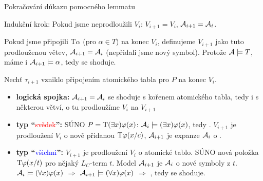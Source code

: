 \documentclass{beamer}
\begin{document}
\begin{frame}{Pokračování důkazu pomocného lemmatu}

    \vspace{-6pt}
    \alert{Indukční krok:} Pokud jsme neprodloužili $V_i$: $V_{i+1}=V_i$, $\mathcal{A}_{i+1}=\mathcal{A}_i$.

    \vspace{-3pt}

    Pokud jsme připojili $\mathrm{T}\alpha$ (pro $\alpha\in T$) na konec $V_i$, definujeme $V_{i+1}$ jako tuto prodlouženou větev, $\mathcal{A}_{i+1}=\mathcal{A}_i$ (nepřidali jsme nový symbol). Protože $\mathcal{A}\models T$, máme i $\mathcal{A}_{i+1}\models\alpha$, tedy se shoduje.
  
    Nechť $\tau_{i+1}$ vzniklo připojením atomického tabla pro $P$ na konec $V_i$.

    \vspace{-3pt}
    
    \begin{itemize}
        \item \textbf{logická spojka:} $\mathcal{A}_{i+1}=\mathcal{A}_i$ se shoduje s kořenem atomického tabla, tedy i s některou větví, o tu prodloužíme $V_i$ na $V_{i+1}$
        
        \medskip

        \item \textbf{typ ``}\textcolor{red}{svědek}\textbf{'':} SÚNO $P=\mathrm{T}(\exists x)\varphi(x)$: $\mathcal{A}_i\models(\exists x)\varphi(x)$, tedy . $V_{i+1}$ je prodloužení $V_i$ o nově přidanou $\mathrm{T}\varphi(x/c)$, $\mathcal{A}_{i+1}$ je expanze $\mathcal{A}_i$ o .
        
        \medskip

        \item \textbf{typ ``}\textcolor{blue}{všichni}\textbf{'':} $V_{i+1}$ je prodloužení $V_i$ o atomické tablo. SÚNO nová položka $\mathrm{T}\varphi(x/t)$ pro nějaký $L_C$-term $t$. 
        Model $\mathcal{A}_{i+1}$ je  $\mathcal{A}_i$ o nové symboly z $t$.    
        $\mathcal{A}_i\models(\forall x)\varphi(x)$ $\Rightarrow$ $\mathcal{A}_{i+1}\models(\forall x)\varphi(x)$ $\Rightarrow$ , tedy se shoduje. \hfill\qedsymbol
    \end{itemize}

\end{frame}
\end{document}
